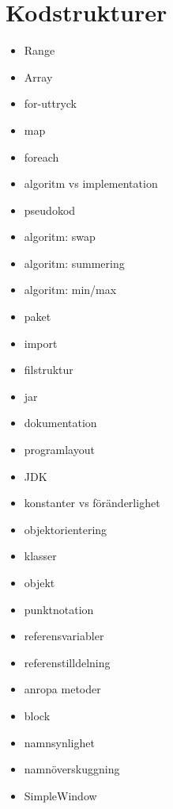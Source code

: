 \chapter{Kodstrukturer}\label{chapter:W02}
\begin{itemize}[nosep]
\item Range
\item Array
\item for-uttryck
\item map
\item foreach
\item algoritm vs implementation
\item pseudokod
\item algoritm: swap
\item algoritm: summering
\item algoritm: min/max
\item paket
\item import
\item filstruktur
\item jar
\item dokumentation
\item programlayout
\item JDK
\item konstanter vs föränderlighet
\item objektorientering
\item klasser
\item objekt
\item punktnotation
\item referensvariabler
\item referenstilldelning
\item anropa metoder
\item block
\item namnsynlighet
\item namnöverskuggning
\item SimpleWindow
\end{itemize}